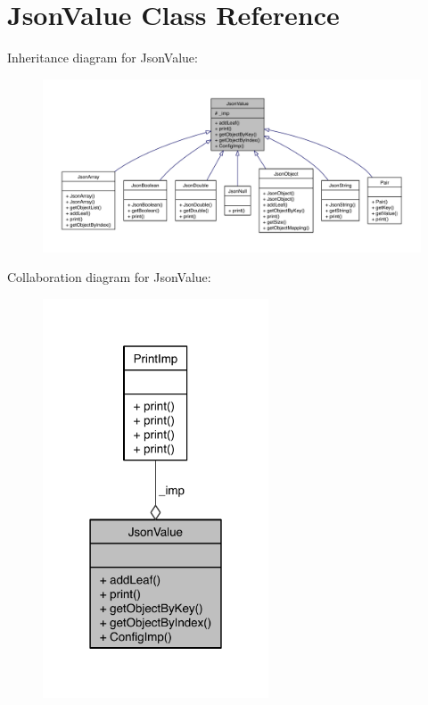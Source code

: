 \hypertarget{class_json_value}{\section{Json\-Value Class Reference}
\label{class_json_value}
}


Inheritance diagram for Json\-Value\-:
\nopagebreak
\begin{figure}[H]
\begin{center}
\leavevmode
\includegraphics[width=350pt]{class_json_value__inherit__graph}
\end{center}
\end{figure}


Collaboration diagram for Json\-Value\-:
\nopagebreak
\begin{figure}[H]
\begin{center}
\leavevmode
\includegraphics[width=190pt]{class_json_value__coll__graph}
\end{center}
\end{figure}
